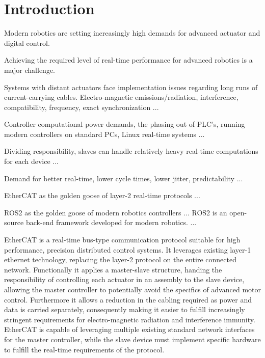\section{Introduction}

Modern robotics are setting increasingly high demands for advanced actuator and digital control. 

Achieving the required level of real-time performance for advanced robotics is a major challenge. 

Systems with distant actuators face implementation issues regarding long runs of current-carrying cables. 
Electro-magnetic emissions/radiation, interference, compatibility, frequency, exact synchronization ...

Controller computational power demands, the phasing out of PLC's, running modern controllers on standard PCs, Linux real-time systems ...

Dividing responsibility, slaves can handle relatively heavy real-time computations for each device ...

Demand for better real-time, lower cycle times, lower jitter, predictability ...

EtherCAT as the golden goose of layer-2 real-time protocols ...

ROS2 as the golden goose of modern robotics controllers ...
ROS2 is an open-source back-end framework developed for modern robotics. ... 

EtherCAT is a real-time bus-type communication protocol suitable for high performance, precision distributed control systems. It leverages existing layer-1 ethernet technology, replacing the layer-2 protocol on the entire connected network. 
Functionally it applies a master-slave structure, handing the responsibility of controlling each actuator in an assembly to the slave device, allowing the master controller to potentially avoid the specifics of advanced motor control. 
Furthermore it allows a reduction in the cabling required as power and data is carried separately, consequently making it easier to fulfill increasingly stringent requirements for electro-magnetic radiation and interference immunity. 
EtherCAT is capable of leveraging multiple existing standard network interfaces for the master controller, while the slave device must implement specific hardware to fulfill the real-time requirements of the protocol. 

